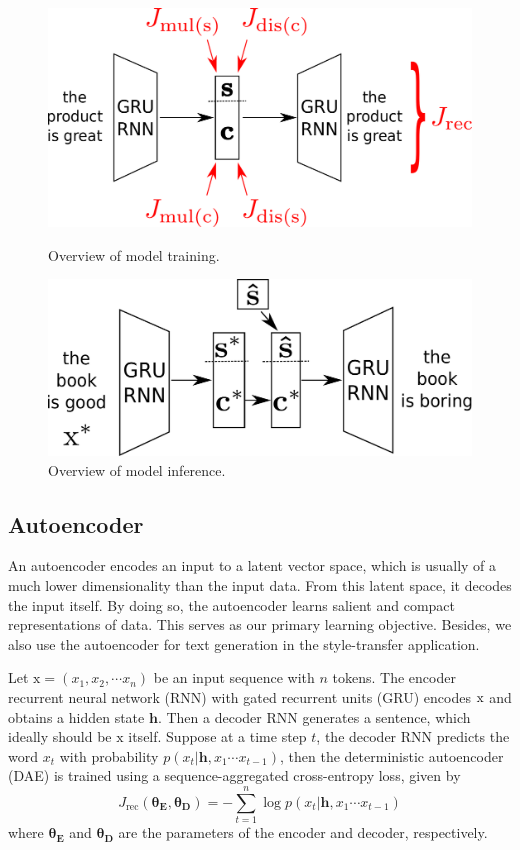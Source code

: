\documentclass[letterpaper]{article} %
\newcommand{\rmx}{\mathrm x}
\newcommand{\loss}[1]{J_{\text{#1}}}
\newcommand{\nnweight}[1]{\bm{\theta_{\text{#1}}}}
\begin{document}
\begin{figure}[ht]
	\centering
	\includegraphics[width=0.8\linewidth]{model-overview-training}
	\caption{Overview of model training.}
	\label{fig:model-training-overview}

	\includegraphics[width=0.8\linewidth]{model-overview-inference}
	\caption{Overview of model inference.}
	\label{fig:model-inference-overview}
\end{figure}

\subsection{Autoencoder} \label{ssec:seq2seq-autoencoder}

An autoencoder encodes an input to a latent vector space, which is usually of a much lower dimensionality than the input data.
From this latent space, it decodes the input itself.
By doing so, the autoencoder learns salient and compact representations of data.
This serves as our primary learning objective.
Besides, we also use the autoencoder for text generation in the style-transfer application.

Let $\rmx=(x_1, x_2, \cdots x_n)$ be an input sequence with $n$ tokens.
The encoder recurrent neural network (RNN) with gated recurrent units (GRU) \cite{cho2014learning} encodes $\rm x$ and obtains a hidden state $\bm h$.
Then a decoder RNN generates a sentence, which ideally should be $\rmx$ itself.
Suppose at a time step $t$, the decoder RNN predicts the word $x_t$ with probability $p(x_t|\bm h, x_1\cdots x_{t-1})$, then the deterministic autoencoder (DAE) is trained using a sequence-aggregated cross-entropy loss, given by
\begin{equation}
	\loss{rec}(\nnweight{E},\nnweight{D})= -\sum_{t=1}^n \log p(x_t|\bm h, x_1\cdots x_{t-1})
\end{equation}
where $\nnweight{E}$ and $\nnweight{D}$ are the parameters of the encoder and decoder, respectively.
\end{document}
